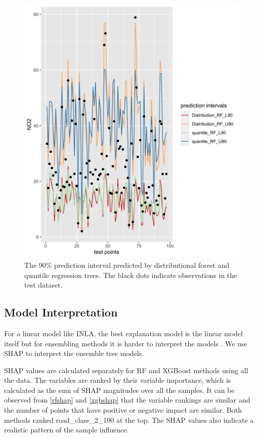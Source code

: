 \documentclass{article}
\begin{document}
\begin{figure}
\centering
\includegraphics[scale = 0.2]{fig/dist_vs_qrf.png}
\caption{The 90\% prediction interval predicted by distributional forest and quantile regression trees. The black dots indicate observations in the test dataset.}
\label{distvsquant}
\end{figure}

\subsection{Model Interpretation} 


For a linear model like INLA, the best explanation model is the linear model itself but for ensembling methods it is harder to interpret the models \citep{NIPS2017_8a20a862}. We use SHAP \citep{NIPS2017_8a20a862} to interpret the ensemble tree models.

SHAP values are calculated separately for RF and XGBoost methods using all the data. The variables are ranked by their variable importance, which is calculated as the sum of SHAP magnitudes over all the samples. It can be observed from \cref{rfshap} and \cref{xgbshap} that the variable rankings are similar and the number of points that have positive or negative impact are similar. Both methods ranked road\_class\_2\_100 at the top. The SHAP values also indicate a realistic pattern of the sample influence. 
\end{document}
